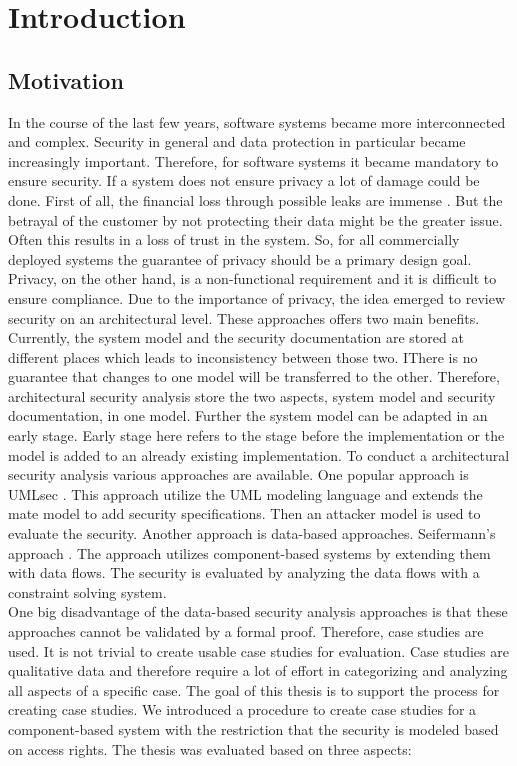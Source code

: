 
\chapter{Introduction}
\label{ch:Introduction}
\section{Motivation}
In the course of the last few years, software systems became more interconnected and complex. Security in general and data protection in particular became increasingly important. Therefore, for software systems it became mandatory to ensure security. If a system does not ensure privacy a lot of damage could be done.  First of all, the financial loss through possible leaks are immense \cite{privHarm}. But the betrayal of the customer by not protecting their data might be the greater issue. Often this results in a loss of trust in the system. So, for all commercially deployed systems the guarantee of privacy should be a primary design goal. Privacy, on the other hand, is a non-functional requirement and it is difficult to ensure compliance. Due to the importance of privacy, the idea emerged to review security on an architectural level. These approaches offers two main benefits. Currently, the system model and the security documentation are stored at different places which leads to inconsistency between those two. IThere is no guarantee that changes to one model will be transferred to the other. Therefore, architectural security analysis store the two aspects, system model and security documentation, in one model. Further the system model can be adapted in an early stage. Early stage here refers to the stage before the implementation or the model is added to an already existing implementation. To conduct a architectural security analysis various approaches are available. One popular approach is UMLsec \cite{UMLSec}. This approach utilize the UML modeling language and extends the mate model to add security specifications. Then an attacker model is used to evaluate the security. Another approach is data-based approaches. Seifermann's approach \citep{Seifermann16}. The approach utilizes component-based systems by extending them with data flows. The security is evaluated by analyzing the data flows with a constraint solving system.\\ One big disadvantage of the data-based security analysis approaches is that these approaches cannot be validated by a formal proof. Therefore, case studies are used. It is not trivial to create usable case studies for evaluation. Case studies are qualitative data and therefore require a lot of effort in categorizing and analyzing all aspects of a specific case. The goal of this thesis is to support the process for creating case studies. We introduced a procedure to create case studies for a component-based system with the restriction that the security is modeled based on access rights. The thesis was evaluated based on three aspects:
